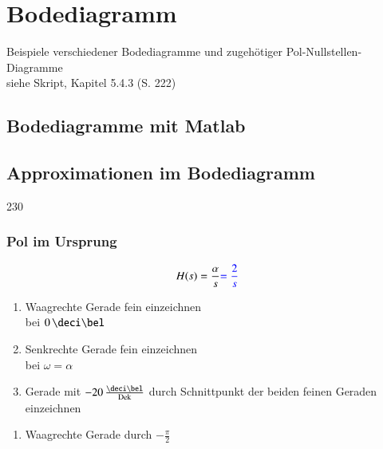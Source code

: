\section{Bodediagramm}

Beispiele verschiedener Bodediagramme und zugehötiger Pol-Nullstellen-Diagramme \\
siehe Skript, Kapitel 5.4.3 (S. 222)


\subsection{Bodediagramme mit Matlab}




\subsection{Approximationen im Bodediagramm}{230}

\subsubsection{Pol im Ursprung}

\begin{minipage}[t]{0.48\columnwidth}
    $$ H(s) = \frac{\alpha}{s} {\color{blue}= \frac{2}{s}} $$
    
\end{minipage}
\hfill
\begin{minipage}[t]{0.48\columnwidth}
        \begin{enumerate}
            \item Waagrechte Gerade fein einzeichnen\\bei $0 \, \deci \bel$
            \item Senkrechte Gerade fein einzeichnen\\bei $\omega = \alpha$
            \item Gerade mit $-20 \, \frac{\deci \bel}{\Dek}$ durch Schnittpunkt der beiden feinen Geraden einzeichnen\\
        \end{enumerate}
    
        \begin{enumerate}
            \item Waagrechte Gerade durch $-\frac{\pi}{2}$
        \end{enumerate}
\end{minipage}


